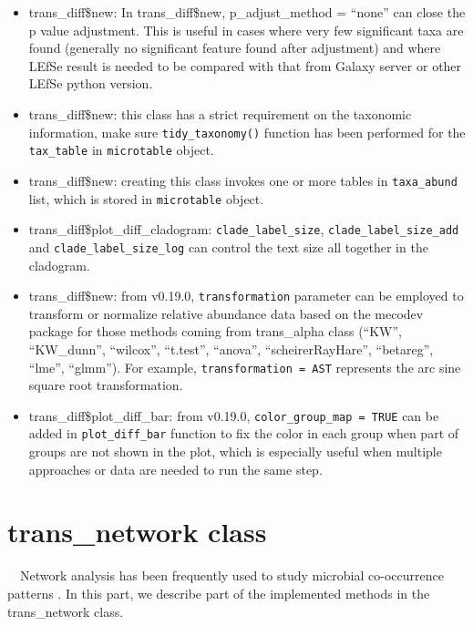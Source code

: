 \documentclass[
]{book}
\providecommand{\tightlist}{%
  \setlength{\itemsep}{0pt}\setlength{\parskip}{0pt}}
\begin{document}
\begin{itemize}
\tightlist
\item
  trans\_diff\$new: In trans\_diff\$new, p\_adjust\_method = ``none'' can close the p value adjustment.
  This is useful in cases where very few significant taxa are found (generally no significant feature found after adjustment) and
  where LEfSe result is needed to be compared with that from Galaxy server or other LEfSe python version.
\item
  trans\_diff\$new: this class has a strict requirement on the taxonomic information,
  make sure \texttt{tidy\_taxonomy()} function has been performed for the \texttt{tax\_table} in \texttt{microtable} object.
\item
  trans\_diff\$new: creating this class invokes one or more tables in \texttt{taxa\_abund} list, which is stored in \texttt{microtable} object.
\item
  trans\_diff\$plot\_diff\_cladogram: \texttt{clade\_label\_size}, \texttt{clade\_label\_size\_add} and \texttt{clade\_label\_size\_log} can control the text size all together in the cladogram.
\item
  trans\_diff\$new: from v0.19.0, \texttt{transformation} parameter can be employed to transform or normalize relative abundance data based on the mecodev package for
  those methods coming from trans\_alpha class (``KW'', ``KW\_dunn'', ``wilcox'', ``t.test'', ``anova'', ``scheirerRayHare'', ``betareg'', ``lme'', ``glmm'').
  For example, \texttt{transformation\ =\ \textquotesingle{}AST\textquotesingle{}} represents the arc sine square root transformation.
\item
  trans\_diff\$plot\_diff\_bar: from v0.19.0, \texttt{color\_group\_map\ =\ TRUE} can be added in \texttt{plot\_diff\_bar} function to
  fix the color in each group when part of groups are not shown in the plot, which is especially useful when multiple approaches or data are needed to run the same step.
\end{itemize}

\hypertarget{trans_network-class}{%
\section{trans\_network class}\label{trans_network-class}}

　Network analysis has been frequently used to study microbial co-occurrence patterns \citep{Deng_Molecular_2012, Faust_Microbial_2012, Coyte_Theecology_2015}.
In this part, we describe part of the implemented methods in the trans\_network class.
\end{document}
